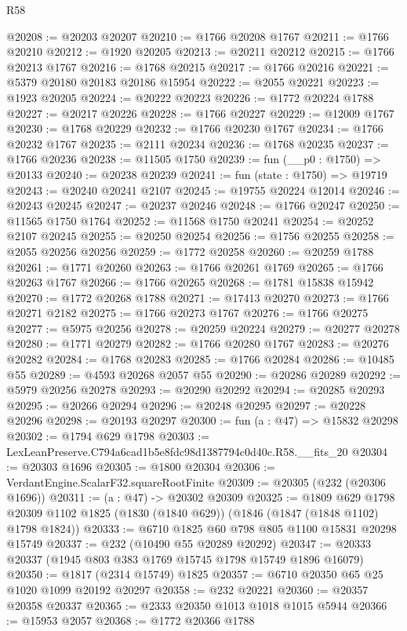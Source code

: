 \begin{lexlean}{R58}
\begin{coremodule}
@20208 := @20203 @20207
@20210 := @1766 @20208 @1767
@20211 := @1766 @20210
@20212 := @1920 @20205
@20213 := @20211 @20212
@20215 := @1766 @20213 @1767
@20216 := @1768 @20215
@20217 := @1766 @20216
@20221 := @5379 @20180 @20183 @20186 @15954
@20222 := @2055 @20221
@20223 := @1923 @20205
@20224 := @20222 @20223
@20226 := @1772 @20224 @1788
@20227 := @20217 @20226
@20228 := @1766 @20227
@20229 := @12009 @1767
@20230 := @1768 @20229
@20232 := @1766 @20230 @1767
@20234 := @1766 @20232 @1767
@20235 := @2111 @20234
@20236 := @1768 @20235
@20237 := @1766 @20236
@20238 := @11505 @1750
@20239 := fun (__p0 : @1750) => @20133
@20240 := @20238 @20239
@20241 := fun (state : @1750) => @19719
@20243 := @20240 @20241 @2107
@20245 := @19755 @20224 @12014
@20246 := @20243 @20245
@20247 := @20237 @20246
@20248 := @1766 @20247
@20250 := @11565 @1750 @1764
@20252 := @11568 @1750 @20241
@20254 := @20252 @2107 @20245
@20255 := @20250 @20254
@20256 := @1756 @20255
@20258 := @2055 @20256 @20256
@20259 := @1772 @20258
@20260 := @20259 @1788
@20261 := @1771 @20260
@20263 := @1766 @20261 @1769
@20265 := @1766 @20263 @1767
@20266 := @1766 @20265
@20268 := @1781 @15838 @15942
@20270 := @1772 @20268 @1788
@20271 := @17413 @20270
@20273 := @1766 @20271 @2182
@20275 := @1766 @20273 @1767
@20276 := @1766 @20275
@20277 := @5975 @20256
@20278 := @20259 @20224
@20279 := @20277 @20278
@20280 := @1771 @20279
@20282 := @1766 @20280 @1767
@20283 := @20276 @20282
@20284 := @1768 @20283
@20285 := @1766 @20284
@20286 := @10485 @55
@20289 := @4593 @20268 @2057 @55
@20290 := @20286 @20289
@20292 := @5979 @20256 @20278
@20293 := @20290 @20292
@20294 := @20285 @20293
@20295 := @20266 @20294
@20296 := @20248 @20295
@20297 := @20228 @20296
@20298 := @20193 @20297
@20300 := fun (a : @47) => @15832 @20298
@20302 := @1794 @629 @1798
@20303 := LexLeanPreserve.C794a6cad1b5e8fdc98d1387794c0d40c.R58.__fits_20
@20304 := @20303 @1696
@20305 := @1800 @20304
@20306 := VerdantEngine.ScalarF32.squareRootFinite
@20309 := @20305 (@232 (@20306 @1696))
@20311 := (a : @47) -> @20302 @20309
@20325 := @1809
    @629
    @1798
    @20309
    @1102
    @1825
    (@1830 (@1840 @629))
    (@1846 (@1847 (@1848 @1102) @1798 @1824))
@20333 := @6710 @1825 @60 @798 @805 @1100 @15831 @20298 @15749
@20337 := @232 (@10490 @55 @20289 @20292)
@20347 := @20333 @20337 (@1945 @803 @383 @1769 @15745 @1798 @15749 @1896 @16079)
@20350 := @1817 (@2314 @15749) @1825
@20357 := @6710 @20350 @65 @25 @1020 @1099 @20192 @20297
@20358 := @232 @20221
@20360 := @20357 @20358 @20337
@20365 := @2333 @20350 @1013 @1018 @1015 @5944
@20366 := @15953 @2057
@20368 := @1772 @20366 @1788

\end{coremodule}
\end{lexlean}

